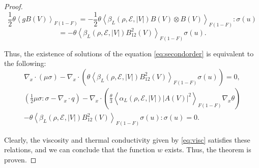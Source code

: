 \begin{proof}
\[ \frac12\theta\left\langle  g B(V) \right\rangle_{F(1-F)}= 
-\frac12\theta\left\langle \beta_L(\rho,\mathcal E,|V|)  B(V)\otimes B(V) 
\right\rangle_{F(1-F)} :\sigma(u)\]
\[=-\theta \left\langle \beta_L(\rho,\mathcal E,|V|)  
B_{12}^2(V)\right\rangle_{F(1-F)} \sigma(u).\]


Thus, the existence of solutions of the equation \eqref{eq:secondorder} 
is equivalent to the following:
\[  \nabla_x\cdot (\mu\sigma)- \nabla_x\cdot
 (\theta \left\langle \beta_L(\rho,\mathcal E,|V|)  
B_{12}^2(V)\right\rangle_{F(1-F)} \sigma(u)) =0,\]
 \[\begin{split}\left(\frac {1}{2} \mu\sigma:\sigma-  \nabla_x\cdot q\right)
 -\nabla_x\cdot \left(\frac{\theta}{3} \left\langle \alpha_L(\rho,\mathcal 
E,|V|) |A(V)|^2 \right\rangle_{F(1-F)} 
 \nabla_x\theta\right)\\
 -\theta \left\langle \beta_L(\rho,\mathcal E,|V|)  
B_{12}^2(V)\right\rangle_{F(1-F)} \sigma(u): \sigma(u) 
 =0.\end{split}  \]

Clearly, the  viscosity and thermal conductivity given by \eqref{eq:visc} satisfies these 
relations, and we can conclude that the function $w$ exists. Thus, the theorem is proven.

\end{proof}



